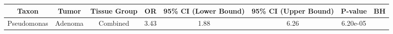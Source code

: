\documentclass[12pt,]{article}
\begin{document}
\scriptsize

\begin{longtable}[]{@{}cccccccc@{}}
\toprule
\begin{minipage}[b]{0.19\columnwidth}\centering\strut
Taxon\strut
\end{minipage} & \begin{minipage}[b]{0.07\columnwidth}\centering\strut
Tumor\strut
\end{minipage} & \begin{minipage}[b]{0.09\columnwidth}\centering\strut
Tissue Group\strut
\end{minipage} & \begin{minipage}[b]{0.03\columnwidth}\centering\strut
OR\strut
\end{minipage} & \begin{minipage}[b]{0.14\columnwidth}\centering\strut
95\% CI (Lower Bound)\strut
\end{minipage} & \begin{minipage}[b]{0.14\columnwidth}\centering\strut
95\% CI (Upper Bound)\strut
\end{minipage} & \begin{minipage}[b]{0.06\columnwidth}\centering\strut
P-value\strut
\end{minipage} & \begin{minipage}[b]{0.06\columnwidth}\centering\strut
BH\strut
\end{minipage}\tabularnewline
\midrule
\endhead
\begin{minipage}[t]{0.19\columnwidth}\centering\strut
Pseudomonas\strut
\end{minipage} & \begin{minipage}[t]{0.07\columnwidth}\centering\strut
Adenoma\strut
\end{minipage} & \begin{minipage}[t]{0.09\columnwidth}\centering\strut
Combined\strut
\end{minipage} & \begin{minipage}[t]{0.03\columnwidth}\centering\strut
3.43\strut
\end{minipage} & \begin{minipage}[t]{0.14\columnwidth}\centering\strut
1.88\strut
\end{minipage} & \begin{minipage}[t]{0.14\columnwidth}\centering\strut
6.26\strut
\end{minipage} & \begin{minipage}[t]{0.06\columnwidth}\centering\strut
6.20e-05\strut

\end{minipage}
\end{longtable}
\end{document}
